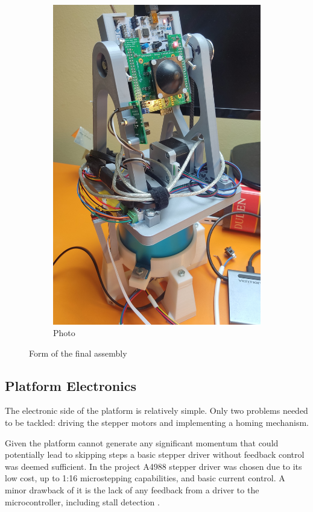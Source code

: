 \begin{figure}[h!]
\begin{subfigure}[b]{0.35\textwidth}
    \includegraphics[width=\textwidth]{../img/assembly_photo.jpg}
    \caption{Photo}
  \end{subfigure}
  \caption{Form of the final assembly}
  \label{fig:side_by_side}
\end{figure}


\subsection{Platform Electronics}

The electronic side of the platform is relatively simple.
Only two problems needed to be tackled: driving the stepper motors and implementing a homing mechanism.

Given the platform cannot generate any significant momentum that could potentially lead to skipping steps a basic stepper driver without feedback control was deemed sufficient.
In the project A4988 stepper driver was chosen due to its low cost, up to 1:16 microstepping capabilities, and basic current control.
A minor drawback of it is the lack of any feedback from a driver to the microcontroller, including stall detection \cite{a4988}.

